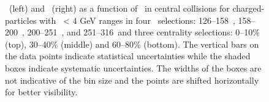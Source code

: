 \begin{figure}
   \caption{\RTheta\ (left) and \RP\ (right) as a function of \rvar\ in central collisions for charged-particles with \pt\ < 4 GeV ranges in four \ptjet\ selections: 126--158~\GeV, 158--200~\GeV, 200--251~\GeV, and 251--316~\GeV and three centrality selections: 0--10\% (top), 30--40\% (middle) and 60--80\% (bottom). The vertical bars on the data points indicate statistical uncertainties while the shaded boxes indicate systematic uncertainties. The widths of the boxes are not indicative of the bin size and the points are shifted horizontally for better visibility. }
      \label{fig:RPRT}
\end{figure}



%


